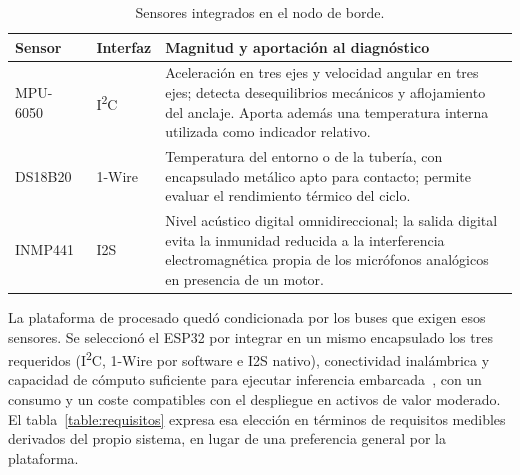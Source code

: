 \begin{table}[ht!]
\caption{Sensores integrados en el nodo de borde.}
\label{table:sensores}
\centering
\begin{tabular}{|p{3cm}|p{2.6cm}|p{7cm}|}
\hline
\textbf{Sensor} & \textbf{Interfaz} & \textbf{Magnitud y aportación al diagnóstico} \\
\hline
MPU-6050~\cite{mpu6050} & I\textsuperscript{2}C & Aceleración en tres ejes y velocidad angular en tres
ejes; detecta desequilibrios mecánicos y aflojamiento del anclaje. Aporta además una
temperatura interna utilizada como indicador relativo. \\
\hline
DS18B20~\cite{ds18b20} & 1-Wire & Temperatura del entorno o de la tubería, con encapsulado metálico apto
para contacto; permite evaluar el rendimiento térmico del ciclo. \\
\hline
INMP441~\cite{inmp441} & I2S & Nivel acústico digital omnidireccional; la salida digital evita la
inmunidad reducida a la interferencia electromagnética propia de los micrófonos analógicos
en presencia de un motor. \\
\hline
\end{tabular}
\end{table}

La plataforma de procesado quedó condicionada por los buses que exigen esos sensores. Se
seleccionó el ESP32 por integrar en un mismo encapsulado los tres requeridos
(I\textsuperscript{2}C, 1-Wire por software e I2S nativo), conectividad inalámbrica y capacidad
de cómputo suficiente para ejecutar inferencia embarcada~\cite{esp32datasheet}, con un consumo y
un coste compatibles con el despliegue en activos de valor moderado. El
tabla~\ref{table:requisitos} expresa esa elección en términos de requisitos medibles derivados
del propio sistema, en lugar de una preferencia general por la plataforma.

